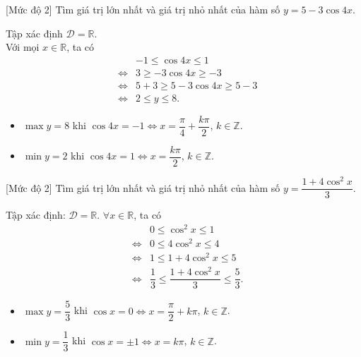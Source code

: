 \begin{bt}%
	[Mức độ 2]
	Tìm giá trị lớn nhất và giá trị nhỏ nhất của hàm số $ y=5-3 \cos 4 x $.
	\loigiai
	{
		Tập xác định $ \mathscr{D}=\mathbb{R}$.\\
		Với mọi $x \in \mathbb{R} $, ta có
		\begin{eqnarray*}
			&&-1 \leq \cos 4 x \leq 1 \\
			&\Leftrightarrow& 3 \geq-3 \cos 4 x \geq-3\\
			&\Leftrightarrow& 5+3 \geq 5-3 \cos 4 x \geq 5-3 \\
			&\Leftrightarrow& 2 \leq y \leq 8. 
		\end{eqnarray*}
	\begin{itemize}
		\item $ \max y=8 $ khi $ \cos 4 x=-1 \Leftrightarrow x=\dfrac{\pi}{4}+\dfrac{k\pi}{2}$, $k\in\mathbb{Z}$.
		\item $ \min y=2 $ khi $ \cos 4 x=1 \Leftrightarrow x=\dfrac{k\pi}{2}$, $k\in\mathbb{Z}$.
	\end{itemize}
	}
\end{bt}

\begin{bt}%
	[Mức độ 2]
	Tìm giá trị lớn nhất và giá trị nhỏ nhất của hàm số $ y=\dfrac{1+4 \cos^2 x}{3} $.
	\loigiai
	{
		Tập xác định: $ \mathscr{D}=\mathbb{R}$. $ \forall x \in \mathbb{R} $, ta có 
		\begin{eqnarray*}
			&& 0\leq \cos^2 x \leq 1\\
			&\Leftrightarrow& 0\leq 4\cos^2 x \leq 4\\
			&\Leftrightarrow& 1\leq 1+4\cos^2 x \leq 5\\
			&\Leftrightarrow& \dfrac{1}{3}\leq \dfrac{1+4\cos^2 x}{3} \leq \dfrac{5}{3}.
		\end{eqnarray*}
	\begin{itemize}
		\item $ \max y=\dfrac{5}{3} $ khi $ \cos x=0 \Leftrightarrow x=\dfrac{\pi}{2}+k\pi$, $k\in \mathbb{Z}$.
		\item $ \min y=\dfrac{1}{3} $ khi $ \cos  x=\pm1 \Leftrightarrow x=k\pi$, $k\in \mathbb{Z}$.
	\end{itemize}
	}
\end{bt}

